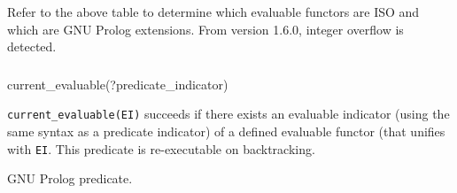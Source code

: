 \Portability

Refer to the above table to determine which evaluable functors are ISO
and which are GNU Prolog extensions. From version 1.6.0, integer
overflow is detected.

\subsubsection{\label{current-evaluable/1}}

\begin{TemplatesOneCol}
current\_evaluable(?predicate\_indicator)

\end{TemplatesOneCol}

\Description

\texttt{current\_evaluable(EI)} succeeds if there exists an evaluable indicator
(using the same syntax as a predicate indicator) of a defined evaluable functor
(that unifies with \texttt{EI}. This predicate is re-executable on backtracking.

\begin{PlErrors}






\end{PlErrors}

\Portability

GNU Prolog predicate.

\subsubsection{\label{evaluable-property/2}}

